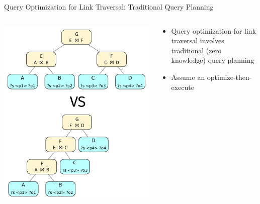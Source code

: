\begin{frame}{Query Optimization for Link Traversal: Traditional Query Planning}
    \begin{columns}[T] %
        \begin{column}{0.6\textwidth} %
            \includegraphics[width=.75\linewidth]{images/query-planning.pdf} %
        \end{column}

        \begin{column}{0.4\textwidth}
            \begin{itemize}
                \item Query optimization for link traversal involves traditional (zero knowledge) query planning
                \item Assume an optimize-then-execute
            \end{itemize}
        \end{column}
    \end{columns}
\end{frame}


